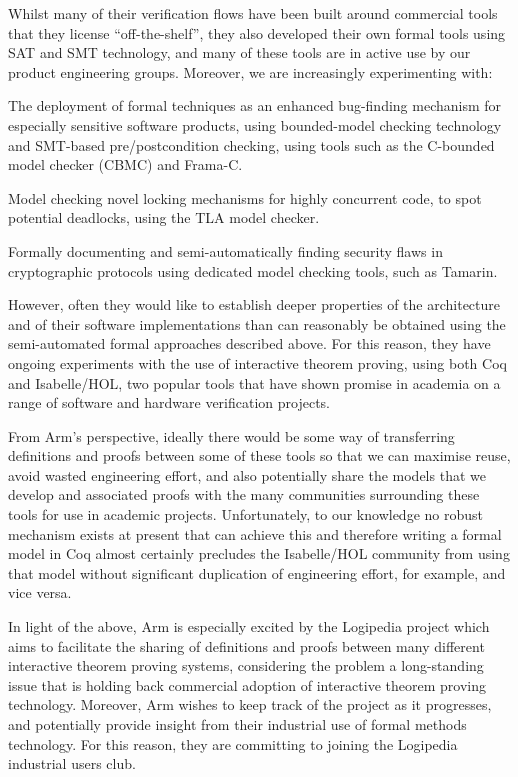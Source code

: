 {Whilst many of their verification flows have been built around
commercial tools that they license ``off-the-shelf'', they also
developed their own formal tools using SAT and SMT technology, and
many of these tools are in active use by our product engineering
groups. Moreover, we are increasingly experimenting with:

\begin{compactitem}
\item The deployment of formal techniques as an enhanced bug-finding
  mechanism for especially sensitive software products, using
  bounded-model checking technology and SMT-based pre/postcondition
  checking, using tools such as the C-bounded model checker (CBMC) and
  Frama-C.
\item Model checking novel locking mechanisms for highly concurrent
  code, to spot potential deadlocks, using the TLA model checker.
\item Formally documenting and semi-automatically finding security
  flaws in cryptographic protocols using dedicated model checking
  tools, such as Tamarin.
\end{compactitem}

However, often they would like to establish deeper properties of the
architecture and of their software implementations than can reasonably
be obtained using the semi-automated formal approaches described
above. For this reason, they have ongoing experiments with the use of
interactive theorem proving, using both Coq and Isabelle/HOL, two
popular tools that have shown promise in academia on a range of
software and hardware verification projects.

From Arm’s perspective, ideally there would be some way of
transferring definitions and proofs between some of these tools so
that we can maximise reuse, avoid wasted engineering effort, and also
potentially share the models that we develop and associated proofs
with the many communities surrounding these tools for use in academic
projects. Unfortunately, to our knowledge no robust mechanism exists
at present that can achieve this and therefore writing a formal model
in Coq almost certainly precludes the Isabelle/HOL community from
using that model without significant duplication of engineering
effort, for example, and vice versa.

In light of the above, Arm is especially excited by the Logipedia
project which aims to facilitate the sharing of definitions and proofs
between many different interactive theorem proving systems,
considering the problem a long-standing issue that is holding back
commercial adoption of interactive theorem proving technology.
Moreover, Arm wishes to keep track of the project as it progresses,
and potentially provide insight from their industrial use of formal
methods technology. For this reason, they are committing to joining
the Logipedia industrial users club.


}
